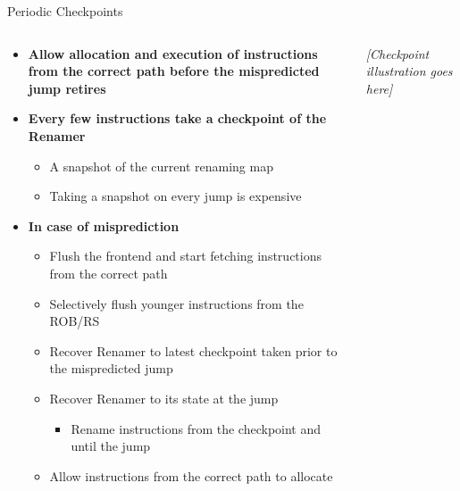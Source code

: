 \documentclass[aspectratio=169,12pt]{beamer}
\begin{document}
\begin{frame}{Periodic Checkpoints}
  \begin{columns}[T] %
    \begin{column}{0.8\textwidth}
      \begin{itemize}
        \item \textbf{Allow allocation and execution of instructions from the correct path before the mispredicted jump retires}
        
        \vspace{0.3cm}
        \item \textbf{Every few instructions take a checkpoint of the Renamer}
        \begin{itemize}
          \item A snapshot of the current renaming map
          \item Taking a snapshot on every jump is expensive
        \end{itemize}
        
        \vspace{0.3cm}
        \item \textbf{In case of misprediction}
        \begin{itemize}
          \item Flush the frontend and start fetching instructions from the correct path
          \item Selectively flush younger instructions from the ROB/RS
          \item Recover Renamer to latest checkpoint taken prior to the mispredicted jump
          \item Recover Renamer to its state at the jump
          \begin{itemize}
            \item Rename instructions from the checkpoint and until the jump
          \end{itemize}
          \item Allow instructions from the correct path to allocate
        \end{itemize}
      \end{itemize}
    \end{column}

    \begin{column}{0.2\textwidth}
      \centering
      \textit{[Checkpoint illustration goes here]}
    \end{column}
  \end{columns}
\end{frame}
\end{document}
